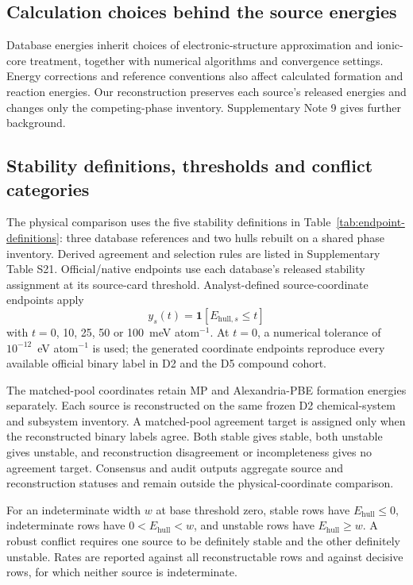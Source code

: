 \documentclass[twoside,twocolumn,9pt]{article}
\begin{document}
\subsection{Calculation choices behind the source energies}

Database energies inherit choices of electronic-structure approximation and ionic-core treatment,\cite{perdew1996generalized,blochl1994projector,kresse1999ultrasoft} together with numerical algorithms and convergence settings.\cite{kresse1996efficient,calderon2015aflow,lejaeghere2016reproducibility} Energy corrections and reference conventions also affect calculated formation and reaction energies.\cite{wang2006oxidation,jain2011formation,stevanovic2012correcting,hautier2012accuracy} Our reconstruction preserves each source's released energies and changes only the competing-phase inventory. Supplementary Note 9 gives further background.

\subsection{Stability definitions, thresholds and conflict categories}

The physical comparison uses the five stability definitions in Table~\ref{tab:endpoint-definitions}: three database references and two hulls rebuilt on a shared phase inventory. Derived agreement and selection rules are listed in Supplementary Table S21. Official/native endpoints use each database's released stability assignment at its source-card threshold. Analyst-defined source-coordinate endpoints apply
\[
y_s(t)=\mathbf{1}\!\left[E_{\mathrm{hull},s}\leq t\right]
\]
with $t=0$, 10, 25, 50 or 100~meV atom$^{-1}$. At $t=0$, a numerical tolerance of $10^{-12}$~eV atom$^{-1}$ is used; the generated coordinate endpoints reproduce every available official binary label in D2 and the D5 compound cohort.

The matched-pool coordinates retain MP and Alexandria-PBE formation energies separately. Each source is reconstructed on the same frozen D2 chemical-system and subsystem inventory. A matched-pool agreement target is assigned only when the reconstructed binary labels agree. Both stable gives stable, both unstable gives unstable, and reconstruction disagreement or incompleteness gives no agreement target. Consensus and audit outputs aggregate source and reconstruction statuses and remain outside the physical-coordinate comparison.

For an indeterminate width $w$ at base threshold zero, stable rows have $E_{\mathrm{hull}}\leq0$, indeterminate rows have $0<E_{\mathrm{hull}}<w$, and unstable rows have $E_{\mathrm{hull}}\geq w$. A robust conflict requires one source to be definitely stable and the other definitely unstable. Rates are reported against all reconstructable rows and against decisive rows, for which neither source is indeterminate.
\end{document}
